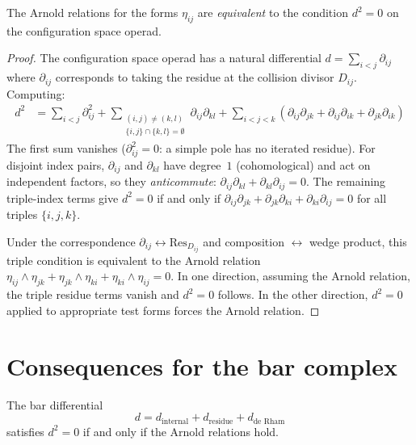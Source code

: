 \begin{proposition}[Operadic equivalence: Arnold relations \texorpdfstring{$\Leftrightarrow$}{iff} \texorpdfstring{$d^2 = 0$}{d\textasciicircum 2 = 0}; \ClaimStatusProvedHere]\label{prop:operadic-equivalence-arnold}
The Arnold relations for the forms $\eta_{ij}$ are \emph{equivalent} to the condition $d^2 = 0$ on the configuration space operad.
\end{proposition}

\begin{proof}
The configuration space operad has a natural differential $d = \sum_{i<j} \partial_{ij}$ where $\partial_{ij}$ corresponds to taking the residue at the collision divisor $D_{ij}$.  Computing:
\begin{align}
d^2 &= \sum_{i<j} \partial_{ij}^2 + \sum_{\substack{(i,j) \neq (k,l) \\ \{i,j\} \cap \{k,l\} = \emptyset}} \partial_{ij} \partial_{kl} + \sum_{i<j<k} (\partial_{ij}\partial_{jk} + \partial_{ij}\partial_{ik} + \partial_{jk}\partial_{ik})
\end{align}
The first sum vanishes ($\partial_{ij}^2 = 0$: a simple pole has no iterated residue).  For disjoint index pairs, $\partial_{ij}$ and $\partial_{kl}$ have degree~$1$ (cohomological) and act on independent factors, so they \emph{anticommute}: $\partial_{ij}\partial_{kl} + \partial_{kl}\partial_{ij} = 0$.  The remaining triple-index terms give $d^2 = 0$ if and only if $\partial_{ij}\partial_{jk} + \partial_{jk}\partial_{ki} + \partial_{ki}\partial_{ij} = 0$ for all triples $\{i,j,k\}$.

Under the correspondence $\partial_{ij} \leftrightarrow \text{Res}_{D_{ij}}$ and composition $\leftrightarrow$ wedge product, this triple condition is equivalent to the Arnold relation $\eta_{ij} \wedge \eta_{jk} + \eta_{jk} \wedge \eta_{ki} + \eta_{ki} \wedge \eta_{ij} = 0$.  In one direction, assuming the Arnold relation, the triple residue terms vanish and $d^2 = 0$ follows.  In the other direction, $d^2 = 0$ applied to appropriate test forms forces the Arnold relation.
\end{proof}

\section{Consequences for the bar complex}

\begin{theorem}
\label{thm:bar-d-squared-arnold}
The bar differential
\[d = d_{\text{internal}} + d_{\text{residue}} + d_{\text{de Rham}}\]
satisfies $d^2 = 0$ if and only if the Arnold relations hold.
\end{theorem}

